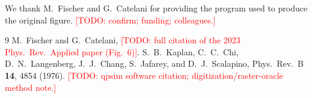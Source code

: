 \documentclass[reprint,amsmath,amssymb,aps,prapplied,nofootinbib]{revtex4-2}
\newcommand{\todo}[1]{\textcolor{red}{[TODO: #1]}}
\begin{document}
\begin{acknowledgments}
We thank M.~Fischer and G.~Catelani for providing the program used to
produce the original figure. \todo{confirm; funding; colleagues.}
\end{acknowledgments}

\begin{thebibliography}{9}
 M.~Fischer and G.~Catelani,
\todo{full citation of the 2023 Phys.\ Rev.\ Applied paper (Fig.~6)}.
 S.~B.~Kaplan, C.~C.~Chi, D.~N.~Langenberg,
J.~J.~Chang, S.~Jafarey, and D.~J.~Scalapino, Phys.\ Rev.\ B
\textbf{14}, 4854 (1976).
\todo{qpsim software citation; digitization/raster-oracle method note.}
\end{thebibliography}
\end{document}
